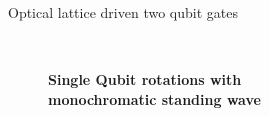\documentclass[final]{beamer}
\begin{document}
\begin{frame}{}
\begin{center}
\begin{columns}[t]
\begin{column}{0.49\textwidth}
\begin{alertblock}{Optical lattice driven two qubit gates}
\begin{minipage}{0.60\linewidth}
\begin{itemize}
\begin{figure}
      \end{figure}
      \end{itemize}
      \end{minipage}
      ~
      \begin{minipage}{0.37\linewidth}
      \begin{figure}
        \textbf{\large Single Qubit rotations with \\ monochromatic standing wave\normalsize}
      \end{figure}
      \end{minipage}
      \begin{figure}

\end{figure}
\end{alertblock}
\end{column}
\end{columns}
\end{center}
\end{frame}
\end{document}
